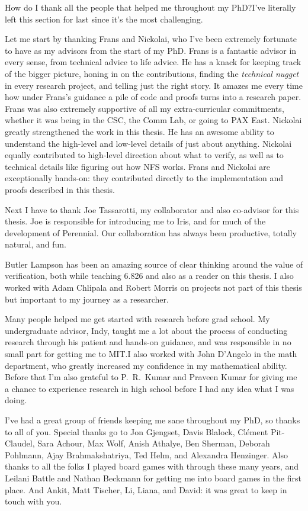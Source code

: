 How do I thank all the people that helped me throughout my PhD?\@ I've literally
left this section for last since it's the most challenging.

Let me start by thanking Frans and Nickolai, who I've been extremely fortunate
to have as my advisors from the start of my PhD. Frans is a fantastic advisor in
every sense, from technical advice to life advice. He has a knack for keeping
track of the bigger picture, honing in on the contributions, finding the
\emph{technical nugget} in every research project, and telling just the right
story. It amazes me every time how under Frans's guidance a pile of code and
proofs turns into a research paper. Frans was also extremely supportive of all
my extra-curricular commitments, whether it was being in the CSC, the Comm Lab,
or going to PAX East. Nickolai greatly strengthened the work in this thesis. He
has an awesome ability to understand the high-level and low-level details of
just about anything. Nickolai equally contributed to high-level direction about
what to verify, as well as to technical details like figuring out how NFS works.
Frans and Nickolai are exceptionally hands-on: they contributed directly to the
implementation and proofs described in this thesis.

Next I have to thank Joe Tassarotti, my collaborator and also co-advisor for
this thesis. Joe is
responsible for introducing me to Iris, and for much of the development of
Perennial. Our collaboration has always been productive, totally natural, and fun.

Butler Lampson has been an amazing source of clear thinking around the value of
verification, both while teaching 6.826 and also as a reader on this thesis. I
also worked with Adam Chlipala and Robert Morris on projects not part of this
thesis but important to my journey as a researcher.

Many people helped me get started with research before grad school. My
undergraduate advisor, Indy, taught me a lot about the process of conducting
research through his patient and hands-on guidance, and was responsible in no
small part for getting me to MIT.\@ I also worked with John D'Angelo in
the math department, who greatly increased my confidence in my mathematical
ability. Before that I'm also grateful to P.~R.~Kumar and Praveen
Kumar for giving me a chance to experience research in high school before I had
any idea what I was doing.

I've had a great group of friends keeping me sane throughout my PhD, so thanks
to all of you. Special thanks go to Jon Gjengset, Davis Blalock, Cl\'ement
Pit-Claudel, Sara Achour, Max Wolf, Anish Athalye, Ben Sherman, Deborah
Pohlmann, Ajay Brahmakshatriya, Ted Helm, and Alexandra Henzinger. Also thanks
to all the folks I played board games with through these many years, and Leilani
Battle and Nathan Beckmann for getting me into board games in the first place.
And Ankit, Matt Tischer, Li, Liana, and David: it was great to keep in touch
with you.

